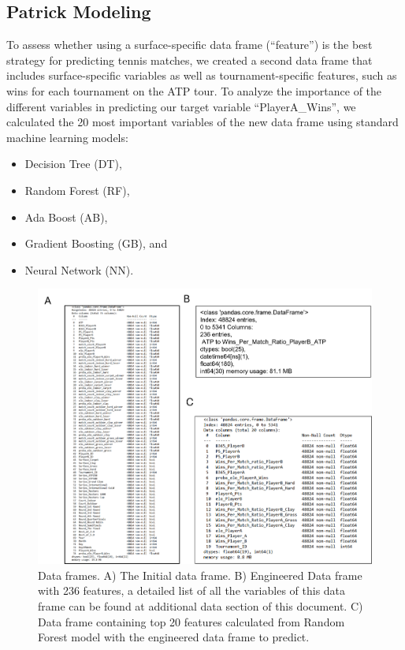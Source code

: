 
\subsection{Patrick Modeling}

To assess whether using a surface-specific data frame (``feature'') is the best strategy for predicting tennis matches, we created a second data frame that includes surface-specific variables as well as tournament-specific features, such as wins for each tournament on the ATP tour. To analyze the importance of the different variables in predicting our target variable ``PlayerA\_Wins'', we calculated the 20 most important variables of the new data frame using standard machine learning models:
%
\begin{itemize}
\item Decision Tree (DT),
\item Random Forest (RF),
\item Ada Boost (AB),
\item Gradient Boosting (GB), and
\item Neural Network (NN).
\end{itemize}

%
\begin{figure}[h]
\includegraphics[width=\textwidth]{pictures/dataframes_patrick.png}
\caption{Data frames. A)  The Initial data frame. B) Engineered Data frame with 236 features, a detailed list of all the variables of this data frame can be found at additional data section of this document. C) Data frame containing top 20 features calculated from Random Forest model with the engineered data frame to predict.}
\label{dataframes_patrick}
\end{figure}
%

